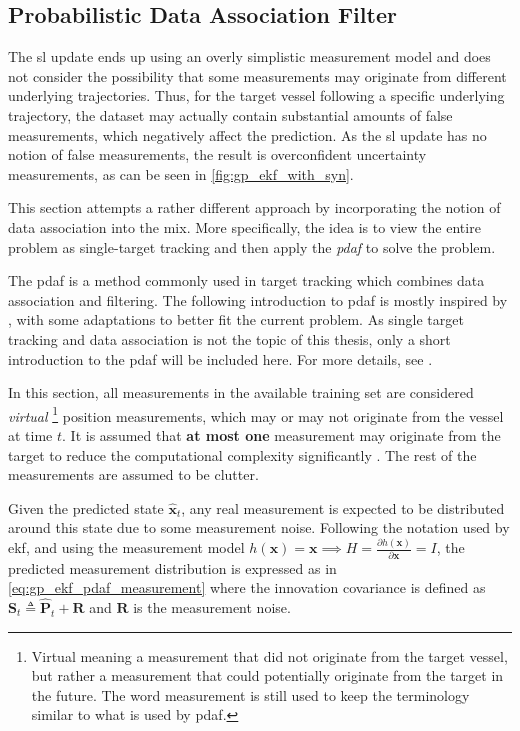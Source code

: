 \subsection{Probabilistic Data Association Filter}
The \acrshort{sl} update ends up using an overly simplistic measurement model and does not consider the possibility that some measurements may originate from different underlying trajectories. Thus, for the target vessel following a specific underlying trajectory, the dataset may actually contain substantial amounts of false measurements, which negatively affect the prediction. As the \acrshort{sl} update has no notion of false measurements, the result is overconfident uncertainty measurements, as can be seen in \cref{fig:gp_ekf_with_syn}.

This section attempts a rather different approach by incorporating the notion of data association into the mix. More specifically, the idea is to view the entire problem as single-target tracking and then apply the \textit{\acrfull{pdaf}} to solve the problem.

The \acrshort{pdaf} is a method commonly used in target tracking which combines data association and filtering. The following introduction to \acrshort{pdaf} is mostly inspired by \cite{sensorfusjon}, with some adaptations to better fit the current problem. As single target tracking and data association is not the topic of this thesis, only a short introduction to the \acrshort{pdaf} will be included here. For more details, see \cite{sensorfusjon,bar1995multitarget}.

In this section, all measurements in the available training set are considered \textit{virtual} \footnote{Virtual meaning a measurement that did not originate from the target vessel, but rather a measurement that could potentially originate from the target in the future. The word measurement is still used to keep the terminology similar to what is used by \acrshort{pdaf}.} position measurements, which may or may not originate from the vessel at time $t$. It is assumed that \textbf{at most one} measurement may originate from the target to reduce the computational complexity significantly \cite{sensorfusjon}. The rest of the measurements are assumed to be clutter.

Given the predicted state $\hat{\boldsymbol{x}}_t$, any real measurement is expected to be distributed around this state due to some measurement noise. Following the notation used by \acrshort{ekf}, and using the measurement model $h(\boldsymbol{x}) = \boldsymbol{x} \implies H = \frac{\partial h (\boldsymbol{x})}{\partial \boldsymbol{x}} = I$, the predicted measurement distribution is expressed as in \cref{eq:gp_ekf_pdaf_measurement} where the innovation covariance is defined as $\boldsymbol{S}_t \triangleq \hat{\boldsymbol{P}}_t + \boldsymbol{R}$ and $\boldsymbol{R}$ is the measurement noise.

